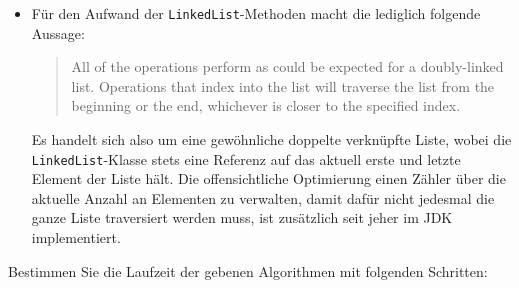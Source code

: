 \documentclass[german]{acAssignment}
\begin{document}
\begin{itemize}[itemsep=0.4cm]
    \item
        \begin{myAlgTable}{5}
            \myAlgTableRow{}{}
            \myAlgTableRow{}{}
            \myAlgTableRow{}{\}}
        \end{myAlgTable}
        
        Für den Aufwand der \texttt{LinkedList}-Methoden macht die  lediglich folgende Aussage:
        \begin{quote}
            All of the operations perform as could be expected for a doubly-linked list.
            Operations that index into the list will traverse the list from the beginning or the end, whichever is closer to the specified index.
        \end{quote}
        Es handelt sich also um eine gewöhnliche doppelte verknüpfte Liste, wobei die \texttt{LinkedList}-Klasse stets eine Referenz auf das aktuell erste und letzte Element der Liste hält.
        Die offensichtliche Optimierung einen Zähler über die aktuelle Anzahl an Elementen zu verwalten, damit dafür nicht jedesmal die ganze Liste traversiert werden muss, ist zusätzlich seit jeher im JDK implementiert.
\end{itemize}
\let\arraystretch\oldarraystretch

\clearpage
Bestimmen Sie die Laufzeit der gebenen Algorithmen mit folgenden Schritten:
\end{document}
